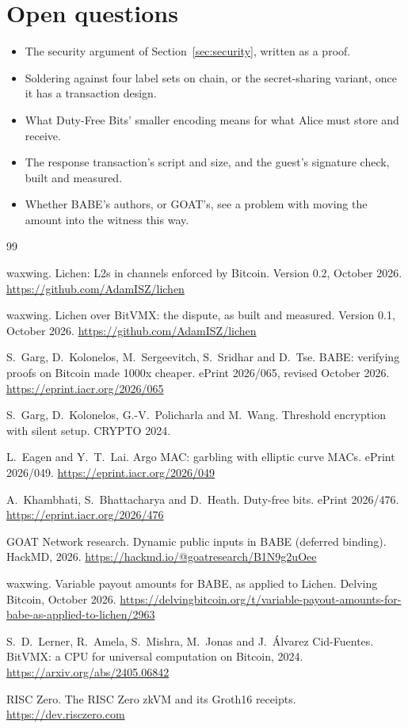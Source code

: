 \documentclass[11pt]{article}
\begin{document}
\section{Open questions}
\label{sec:open}

\begin{itemize}[leftmargin=1.5em]
\item The security argument of Section~\ref{sec:security}, written as a
  proof.
\item Soldering against four label sets on chain, or the secret-sharing
  variant, once it has a transaction design.
\item What Duty-Free Bits' smaller encoding means for what Alice must
  store and receive.
\item The response transaction's script and size, and the guest's
  signature check, built and measured.
\item Whether BABE's authors, or GOAT's, see a problem with moving the
  amount into the witness this way.
\end{itemize}

\begin{thebibliography}{99}

 waxwing. Lichen: L2s in channels enforced by Bitcoin. Version 0.2, October 2026. \url{https://github.com/AdamISZ/lichen}

 waxwing. Lichen over BitVMX: the dispute, as built and measured. Version 0.1, October 2026. \url{https://github.com/AdamISZ/lichen}

 S.~Garg, D.~Kolonelos, M.~Sergeevitch, S.~Sridhar and D.~Tse. BABE: verifying proofs on Bitcoin made 1000x cheaper. ePrint 2026/065, revised October 2026. \url{https://eprint.iacr.org/2026/065}

 S.~Garg, D.~Kolonelos, G.-V.~Policharla and M.~Wang. Threshold encryption with silent setup. CRYPTO 2024.

 L.~Eagen and Y.~T.~Lai. Argo MAC: garbling with elliptic curve MACs. ePrint 2026/049. \url{https://eprint.iacr.org/2026/049}

 A.~Khambhati, S.~Bhattacharya and D.~Heath. Duty-free bits. ePrint 2026/476. \url{https://eprint.iacr.org/2026/476}

 GOAT Network research. Dynamic public inputs in BABE (deferred binding). HackMD, 2026. \url{https://hackmd.io/@goatresearch/B1N9g2uOee}

 waxwing. Variable payout amounts for BABE, as applied to Lichen. Delving Bitcoin, October 2026. \url{https://delvingbitcoin.org/t/variable-payout-amounts-for-babe-as-applied-to-lichen/2963}

 S.~D.~Lerner, R.~Amela, S.~Mishra, M.~Jonas and J.~\'Alvarez Cid-Fuentes. BitVMX: a CPU for universal computation on Bitcoin, 2024. \url{https://arxiv.org/abs/2405.06842}

 RISC Zero. The RISC Zero zkVM and its Groth16 receipts. \url{https://dev.risczero.com}

\end{thebibliography}
\end{document}
